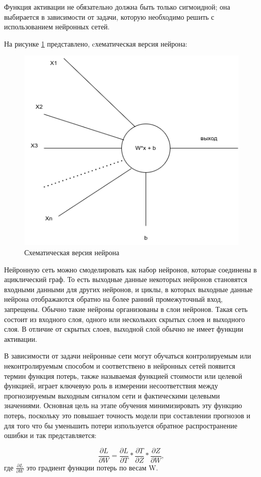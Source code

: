 Функция активации не обязательно должна быть только сигмоидной; она выбирается в зависимости от задачи, которую необходимо решить с использованием нейронных сетей.

На рисунке \ref{fig:neuron} представлено, cхематическая версия нейрона:
\begin{figure}[H]
	\centering
	\includegraphics[width=0.6\linewidth]{assets/neuron.png}
	\caption{Схематическая версия нейрона}
	\label{fig:neuron}
\end{figure}

Нейронную сеть можно смоделировать как набор нейронов, которые соединены в ациклический граф. То есть выходные данные некоторых нейронов становятся входными данными для других нейронов, и циклы, в которых выходные данные нейрона отображаются обратно на более ранний промежуточный вход, запрещены. Обычно такие нейроны организованы в слои нейронов. Такая сеть состоит из входного слоя, одного или нескольких скрытых слоев и выходного слоя. В отличие от скрытых слоев, выходной слой обычно не имеет функции активации.

В зависимости от задачи нейронные сети могут обучаться контролируемым или неконтролируемым способом и соответствено в нейронных сетей появится термин функция потерь, также называемая функцией стоимости или целевой функцией, играет ключевую роль в измерении несоответствия между прогнозируемым выходным сигналом сети и фактическими целевыми значениями. Основная цель на этапе обучения минимизировать эту функцию потерь, поскольку это повышает точность модели при составлении прогнозов и для того что бы уменьшить потери изпользуется обратное распространение ошибки и так представляется:

\begin{equation}
    \frac{\partial L}{\partial W} = \frac{\partial L}{\partial T} * \frac{\partial T}{\partial Z} * \frac{\partial Z}{\partial W}
, \end{equation}
где \(\frac{\partial L}{\partial W}\) это градиент функции потерь по весам W.

